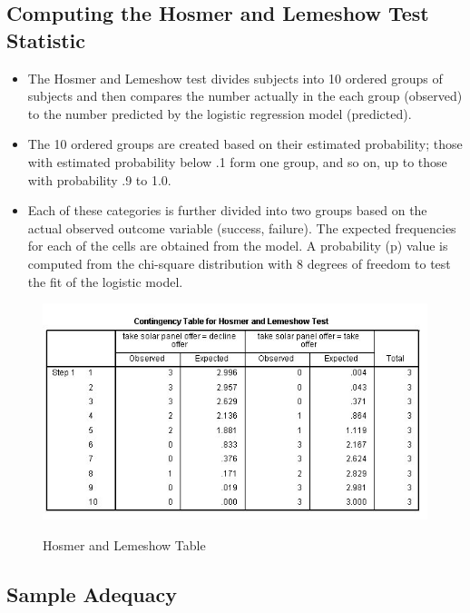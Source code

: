 \documentclass[a4paper,12pt]{article}
\begin{document}
\subsection{Computing the Hosmer and Lemeshow Test Statistic}

\begin{itemize}
	\item The Hosmer and Lemeshow test
	divides subjects into 10 ordered groups of subjects and then compares the number
	actually in the each group (observed) to the number predicted by the logistic regression
	model (predicted). 
	\item The 10 ordered groups are created based on their estimated probability; those with estimated probability below .1 form one group, and so on, up to those with probability .9 to 1.0.
	\item 
	Each of these categories is further divided into two groups based on the actual observed outcome variable (success, failure). The expected frequencies for each of the cells are obtained from the model. A probability (p) value is
	computed from the chi-square distribution with 8 degrees of freedom to test the fit of the logistic model.
	
\end{itemize}
\begin{figure}[h!]
	\begin{center}
		\includegraphics[scale=0.6]{images/Logistic6}\\
		\caption{Hosmer and Lemeshow Table}
	\end{center}
\end{figure}

\subsection{Sample Adequacy}
\end{document}

